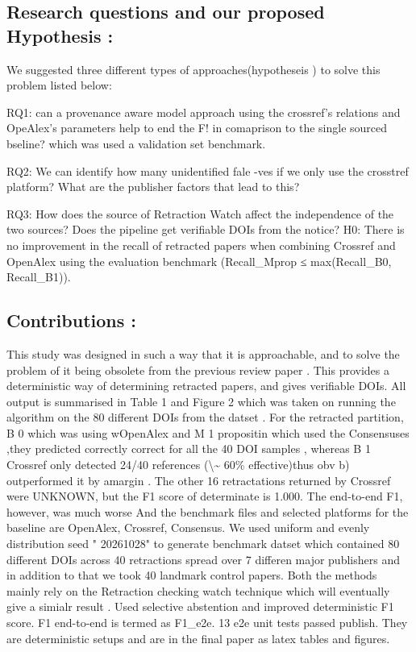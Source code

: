 \documentclass[10pt,a4paper,twocolumn]{article}
\begin{document}
\subsection{Research questions and our proposed Hypothesis :}

We suggested three different types of approaches(hypotheseis ) to solve this problem listed below:

RQ1: can a provenance aware model approach using the crossref's relations and OpeAlex's parameters help to end the F! in comaprison to the single sourced bseline? which was used a validation set benchmark.

RQ2: We can identify how many unidentified fale -ves if we only use the crosstref platform? What are the publisher factors that lead to this?

RQ3: How does the source of Retraction Watch affect the independence of the two sources? Does the pipeline get verifiable DOIs from the notice? H0: There is no improvement in the recall of retracted papers when combining Crossref and OpenAlex using the evaluation benchmark (Recall\_Mprop ≤ max(Recall\_B0, Recall\_B1)).


\subsection{Contributions :}

This study was designed in such a way that it is approachable, and to solve the problem of it being obsolete from the previous review paper . This provides a deterministic way of determining retracted papers, and gives verifiable DOIs. All output is summarised in Table 1 and Figure 2 which was taken on running the algorithm on the 80 different DOIs from the datset . For the retracted partition, B 0 which was using wOpenAlex and M 1 propositin which used the Consensuses ,they predicted correctly correct for all the 40 DOI samples , whereas B 1 Crossref only detected 24/40 references (\textbackslash{}\textasciitilde{} 60\% effective)thus obv b) outperformed it by amargin . The other 16 retractations returned by Crossref were UNKNOWN, but the F1 score of determinate is 1.000. The end-to-end F1, however, was much worse And the benchmark files and selected platforms for the baseline are OpenAlex, Crossref, Consensus. We used uniform and evenly distribution seed " 20261028" to generate benchmark datset which contained 80 different DOIs across 40 retractions spread over 7 differen major publishers and in addition to that we took 40 landmark control papers. Both the methods mainly rely on the Retraction checking watch technique which will eventually give a simialr result . Used selective abstention and improved deterministic F1 score. F1 end-to-end is termed as F1\_e2e. 13 e2e unit tests passed publish. They are deterministic setups and are in the final paper as latex tables and figures.
\end{document}
